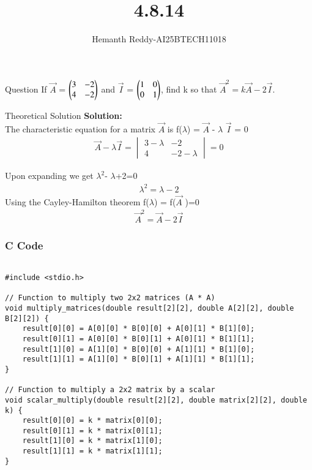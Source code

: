 \documentclass{beamer}
\title %
{ 4.8.14}
\author %
{Hemanth Reddy-AI25BTECH11018}
\begin{document}
\frame{\titlepage}
\begin{frame}{Question}
If $\vec{A}$ = $\begin{pmatrix}3&-2\\4&-2\end{pmatrix}$ and $\vec{I}$ = $\begin{pmatrix}1&0\\0&1\end{pmatrix}$, find k so that $\vec{A}^{2}=k\vec{A}-2\vec{I}$.


\end{frame}



\begin{frame}{Theoretical Solution}
\textbf{Solution:}\\

The characteristic equation for a matrix $\vec{A}$ is
f($\lambda$) = $\vec{A}$ - $\lambda$ $\vec{I}$ = 0 \\
\begin{align}
    \vec{A} - \lambda \vec{I} =\begin{vmatrix}
3 - \lambda & -2  \\
4& -2 - \lambda
\end{vmatrix} = 0
\end{align}

Upon expanding we get \qquad $\lambda^2$- $\lambda $+2=0\\
\begin{align}
     \lambda^2 = \lambda  -2
\end{align}
 Using the Cayley-Hamilton theorem f($\lambda$) = f($\vec{A}$ )=0
 \begin{align}
      \vec{A}^2 =  \vec{A}  -2\vec{I}
\end{align}




\end{frame}



\begin{frame}[fragile]
    \frametitle{C Code }
    \begin{lstlisting}

#include <stdio.h>

// Function to multiply two 2x2 matrices (A * A)
void multiply_matrices(double result[2][2], double A[2][2], double B[2][2]) {
    result[0][0] = A[0][0] * B[0][0] + A[0][1] * B[1][0];
    result[0][1] = A[0][0] * B[0][1] + A[0][1] * B[1][1];
    result[1][0] = A[1][0] * B[0][0] + A[1][1] * B[1][0];
    result[1][1] = A[1][0] * B[0][1] + A[1][1] * B[1][1];
}

// Function to multiply a 2x2 matrix by a scalar
void scalar_multiply(double result[2][2], double matrix[2][2], double k) {
    result[0][0] = k * matrix[0][0];
    result[0][1] = k * matrix[0][1];
    result[1][0] = k * matrix[1][0];
    result[1][1] = k * matrix[1][1];
}



    \end{lstlisting}
\end{frame}
\end{document}
